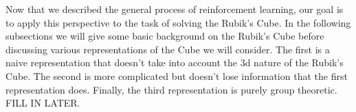 \documentclass[12pt,oneside,oldfontcommands]{memoir}
\theoremstyle{definition}
\begin{document}
\begin{Subsection}[1.3- TD/Q Learning]
\end{Subsection}

\begin{Section}
Now that we described the general process of reinforcement learning, our goal is to apply this perspective to the task of solving the Rubik's Cube.
\tcblower
In the following subsections we will give some basic background on the Rubik's Cube before discussing various representations of the Cube we will consider. The first is a naive representation that doesn't take into account the 3d nature of the Rubik's Cube. The second is more complicated but doesn't lose information that the first representation does. Finally, the third representation is purely group theoretic. FILL IN LATER. 
\end{Section}
\end{document}
